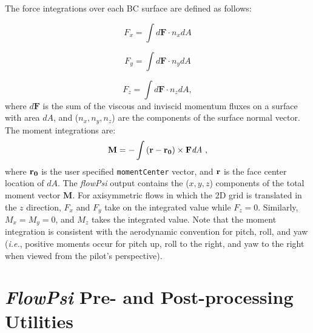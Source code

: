 \documentclass{article}
\begin{document}
The force integrations over each BC surface are defined as follows:

\begin{equation}
F_x = \int{d\textbf{F} \cdot n_x dA}
\end{equation}

\begin{equation}
F_y = \int{d\textbf{F} \cdot n_y dA}
\end{equation}

\begin{equation}
F_z = \int{d\textbf{F} \cdot n_z dA},
\end{equation}
where $d\textbf{F}$ is the sum of the viscous and inviscid momentum fluxes on a surface with area $dA$, and ($n_x,n_y,n_z$) are the components of the surface normal vector.  The moment integrations are:
\begin{equation}
\textbf{M} = - \int{ \bf{(r - r_0)} \times \textbf{F} \textit{dA}} ~ ,
\end{equation}
where $\bf{r_0}$ is the user specified \verb!momentCenter! vector, and
$\bf{r}$ is the face center location of $dA$.  The {\em flowPsi}
output contains the ($x,y,z$) components of the total moment vector
$\textbf{M}$.  For axisymmetric flows in which the 2D grid is
translated in the $z$ direction, $F_x$ and $F_y$ take on the
integrated value while $F_z = 0$.  Similarly, $M_x = M_y = 0$, and
$M_z$ takes the integrated value.  Note that the moment integration is
consistent with the aerodynamic convention for pitch, roll, and yaw
({\it{i.e.}}, positive moments occur for pitch up, roll to the right,
and yaw to the right when viewed from the pilot's perspective).





\section{{\em FlowPsi} Pre- and Post-processing Utilities}
\end{document}

